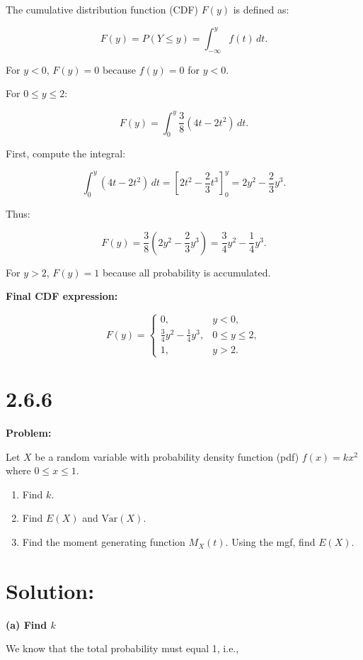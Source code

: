 \documentclass{article}
\begin{document}
The cumulative distribution function (CDF) \( F(y) \) is defined as:

\[
F(y) = P(Y \leq y) = \int_{-\infty}^y f(t) \, dt.
\]

For \( y < 0 \), \( F(y) = 0 \) because \( f(y) = 0 \) for \( y < 0 \).

For \( 0 \leq y \leq 2 \):

\[
F(y) = \int_0^y \frac{3}{8}(4t - 2t^2) \, dt.
\]

First, compute the integral:

\[
\int_0^y (4t - 2t^2) \, dt = \left[ 2t^2 - \frac{2}{3}t^3 \right]_0^y = 2y^2 - \frac{2}{3}y^3.
\]

Thus:

\[
F(y) = \frac{3}{8} \left( 2y^2 - \frac{2}{3}y^3 \right) = \frac{3}{4} y^2 - \frac{1}{4} y^3.
\]

For \( y > 2 \), \( F(y) = 1 \) because all probability is accumulated.

\textbf{Final CDF expression:}

\[
F(y) = 
\begin{cases} 
0, & y < 0, \\
\frac{3}{4}y^2 - \frac{1}{4}y^3, & 0 \leq y \leq 2, \\
1, & y > 2.
\end{cases}
\]

\section*{2.6.6}

\textbf{Problem:}

Let \( X \) be a random variable with probability density function (pdf) \( f(x) = kx^2 \) where \( 0 \leq x \leq 1 \).

\begin{enumerate}
    \item[(a)] Find \( k \).
    \item[(b)] Find \( E(X) \) and \( \text{Var}(X) \).
    \item[(c)] Find the moment generating function \( M_X(t) \). Using the mgf, find \( E(X) \).
\end{enumerate}

\section*{Solution:}

\textbf{(a) Find \( k \)}

We know that the total probability must equal 1, i.e.,
\end{document}
